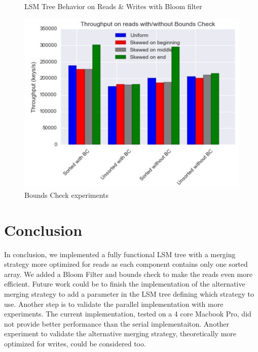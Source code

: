 \documentclass{sig-alternate-05-2015}
\begin{document}
\begin{figure}[H]
\begin{minipage}[b]{\columnwidth}
  \end{minipage}
  \caption{LSM Tree Behavior on Reads \& Writes with Bloom filter}
  \label{fig:bloom}
\end{figure}

\begin{figure}
\centering
\includegraphics[width=\columnwidth]{img/bounds_reads}
\caption{Bounds Check experiments}
\label{ref:bounds}
\end{figure}



\section{Conclusion}

In conclusion, we implemented a fully functional LSM tree with a merging strategy more optimized for reads as each component contains only one sorted array. We added a Bloom Filter and bounds check to make the reads even more efficient. Future work could be to finish the implementation of the alternative merging strategy to add a parameter in the LSM tree defining which strategy to use. Another step is to validate the parallel implementation with more experiments. The current implementation, tested on a 4 core Macbook Pro, did not provide better performance than the serial implementaiton. Another experiment to validate the alternative merging strategy, theoretically more optimized for writes, could be considered too.


\end{document}

